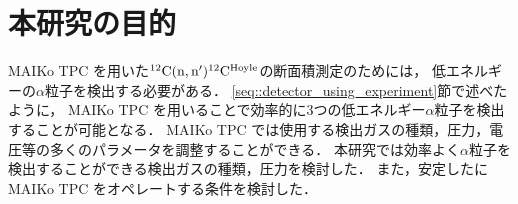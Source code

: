 \documentclass[../master]{subfiles}
\begin{document}

\section{本研究の目的}
MAIKo TPC を用いた${}^{12}{\rm C}({\rm n},{\rm n}'){}^{12}{\rm C}^{\rm Hoyle}$の断面積測定のためには，
低エネルギーの$\alpha$粒子を検出する必要がある．
\ref{seq::detector_using_experiment}節で述べたように，
MAIKo TPC を用いることで効率的に3つの低エネルギー$\alpha$粒子を検出することが可能となる．
MAIKo TPC では使用する検出ガスの種類，圧力，電圧等の多くのパラメータを調整することができる．
本研究では効率よく$\alpha$粒子を検出することができる検出ガスの種類，圧力を検討した．
また，安定したにMAIKo TPC をオペレートする条件を検討した．
\end{document}
